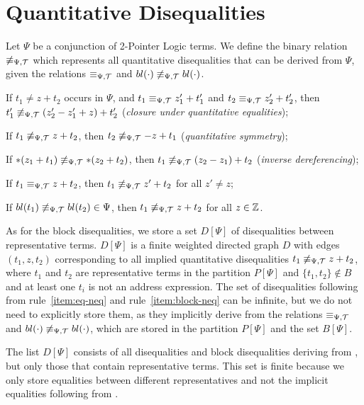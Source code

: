 \section{Quantitative Disequalities}\label{section:disequalities}

Let $\Psi$ be a conjunction of 2-Pointer Logic terms.
We define the binary relation $\not\equiv_{\Psi,\mathcal{T}}$ which represents all quantitative disequalities that can be derived from $\Psi$, given the relations $\equiv_{\Psi,\mathcal{T}}$ and $bl(\cdot)\not\equiv_{\Psi,\mathcal{T}} bl(\cdot)$.

\begin{enumerate}[label={[D\arabic*]}, ref={[D\arabic*]}]
    \setcounter{enumi}{-1} %
    \item\label{item:neq-quantitative-equalities}
    If $t_1 \neq z + t_2$ occurs in $\Psi$, and $t_1 \equiv_{\Psi,\mathcal{T}} z'_1 + t'_1$ and $t_2\equiv_{\Psi,\mathcal{T}} z'_2+t'_2$,
    then $t'_1\not\equiv_{\Psi,\mathcal{T}} (z'_2-z'_1+z)+t'_2$ (\emph{closure under quantitative equalities});
    \item\label{item:neq-quantitative-symmetry} If $t_1 \not\equiv_{\Psi,\mathcal{T}} z + t_2$, then $t_2 \not\equiv_{\Psi,\mathcal{T}} -z + t_1$ (\emph{quantitative symmetry});
    \item\label{item:inverse-deref}
    If $*(z_1 + t_1) \not\equiv_{\Psi,\mathcal{T}} *(z_2 + t_2)$, then $t_1 \not\equiv_{\Psi,\mathcal{T}} (z_2 - z_1) + t_2$
    (\emph{inverse dereferencing});
    \item\label{item:eq-neq} If $t_1 \equiv_{\Psi,\mathcal{T}} z + t_2$, then $t_1\not\equiv_{\Psi,\mathcal{T}} z'+t_2$ for all $z'\neq z$;
    \item\label{item:block-neq} If $bl(t_1) \not\equiv_{\Psi,\mathcal{T}} bl(t_2) \in \Psi$, then $t_1 \not\equiv_{\Psi,\mathcal{T}} z + t_2$ for all $z \in \mathbb{Z}$.
\end{enumerate}

As for the block disequalities, we store a set $D[\Psi]$ of disequalities between representative terms.
$D[\Psi]$ is a finite weighted directed graph $D$ with edges $(t_1,z,t_2)$ corresponding to all implied
quantitative disequalities $t_1 \not\equiv_{\Psi,\mathcal{T}} z+t_2$, where $t_1$ and $t_2$ are representative terms in the partition $P[\Psi]$ and
$\{t_1,t_2\}\not\in B$ and at least one
$t_i$ is not an address expression.
The set of disequalities following from rule~\ref{item:eq-neq} and rule~\ref{item:block-neq} can be infinite, but we do not need to explicitly store them, as they implicitly derive from the relations $\equiv_{\Psi,\mathcal{T}}$ and $bl(\cdot)\not\equiv_{\Psi,\mathcal{T}} bl(\cdot)$, which are stored in the partition $P[\Psi]$ and the set $B[\Psi]$.

The list $D[\Psi]$ consists of all disequalities and block disequalities deriving from
,
but only those that contain representative terms.
This set is finite because we only store equalities between different representatives and not the implicit equalities following from .

